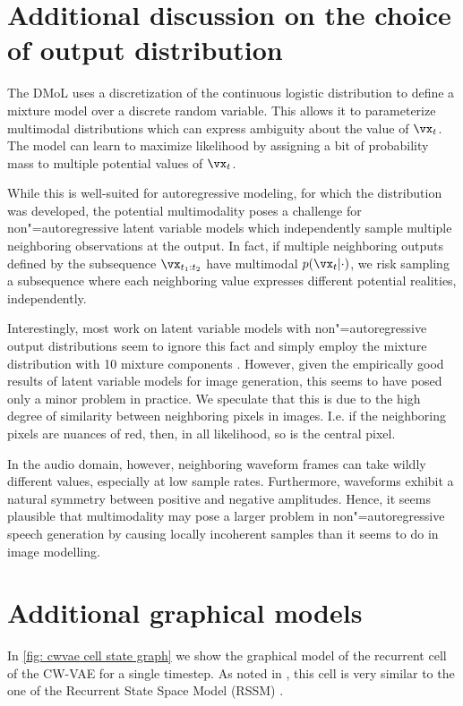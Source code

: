 {\section{Additional discussion on the choice of output distribution}\label{app: additional discussion on output distribution}
The DMoL uses a discretization of the continuous logistic distribution to define a mixture model over a discrete random variable. This allows it to parameterize multimodal distributions which can express ambiguity about the value of $\vx_t$.
The model can learn to maximize likelihood by assigning a bit of probability mass to multiple potential values of $\vx_t$.

While this is well-suited for autoregressive modeling, for which the distribution was developed, the potential multimodality poses a challenge for non"=autoregressive latent variable models which independently sample multiple neighboring observations at the output.
In fact, if multiple neighboring outputs defined by the subsequence $\vx_{t_1:t_2}$ have multimodal $p(\vx_t|\cdot)$, we risk sampling a subsequence where each neighboring value expresses different potential realities, independently. 

Interestingly, most work on latent variable models with non"=autoregressive output distributions seem to ignore this fact and simply employ the mixture distribution with 10 mixture components \parencite{maaloe_biva_2019, vahdat_nvae_2020, child_very_2021}.
However, given the empirically good results of latent variable models for image generation, this seems to have posed only a minor problem in practice. We speculate that this is due to the high degree of similarity between neighboring pixels in images. I.e. if the neighboring pixels are nuances of red, then, in all likelihood, so is the central pixel.

In the audio domain, however, neighboring waveform frames can take wildly different values, especially at low sample rates. Furthermore, waveforms exhibit a natural symmetry between positive and negative amplitudes.
Hence, it seems plausible that multimodality may pose a larger problem in non"=autoregressive speech generation by causing locally incoherent samples than it seems to do in image modelling.


\section{Additional graphical models}\label{app: additional graphical models}
In \cref{fig: cwvae cell state graph} we show the graphical model of the recurrent cell of the CW-VAE for a single timestep. As noted in \parencite{saxena_clockwork_2021}, this cell is very similar to the one of the Recurrent State Space Model (RSSM) \parencite{hafner_learning_2019}.

}
